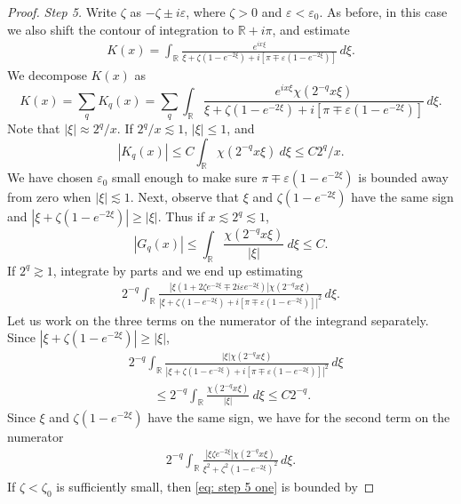 \documentclass[GreensFunctions.tex]{subfiles}
\begin{document}
\begin{proof}
	{\em Step 5.} 
	Write $\zeta$ as $-\zeta\pm i\varepsilon$, where $\zeta>0$ and 
	$\varepsilon<\varepsilon_0$. As before, in this case we also shift 
	the contour of integration to ${\mathbb R}+i\pi$, and estimate
	\begin{align*}
		K(x) 
			= 
				\int_{\mathbb R} 
					\frac{e^{ix\xi}}
						{\xi+\zeta(1-e^{-2\xi})+i[\pi\mp \varepsilon(1-e^{-2\xi})]}
				\,d\xi.	
	\end{align*}
	We decompose $K(x)$ as
	\begin{equation}
		K(x) 
			= 
				\sum_q K_q(x) 
			= 
				\sum_q
				\int_{\mathbb R} 
					\frac{e^{ix\xi}\chi(2^{-q}x\xi)}
						{\xi+\zeta(1-e^{-2\xi})+i[\pi\mp \varepsilon(1-e^{-2\xi})]}
				\,d\xi.
	\end{equation}
	Note that $|\xi|\approx 2^q/x$. If $2^q/x\lesssim 1$, $|\xi|\le 1$, and 
	\[
		|K_q(x)|\le C\int_{\mathbb R} \chi(2^{-q}x\xi)~d\xi\le C2^q/x.
	\]
	We have chosen $\varepsilon_0$ small enough to make sure 
	$\pi\mp \varepsilon(1-e^{-2\xi})$ is bounded away from zero when $|\xi|\lesssim 1$. 
	Next, observe that $\xi$ and $\zeta(1-e^{-2\xi})$ have the same sign and 
	$|\xi+\zeta(1-e^{-2\xi})|\ge |\xi|$. Thus if $x\lesssim 2^q \lesssim 1$, 
	\[
		|G_q(x)|\le \int_{\mathbb R} \frac{\chi(2^{-q}x\xi)}{|\xi|}~d\xi\le C.
	\]
	If $2^q\gtrsim 1$, integrate by parts and we end up estimating
	\begin{align}\label{eq: step 5 two}
		2^{-q}
		\int_{\mathbb R} 
			\frac{|\xi(1+2\zeta e^{-2\xi} \mp 2i\varepsilon e^{-2\xi})|\chi(2^{-q}x\xi)}
				{|\xi+\zeta(1-e^{-2\xi})+i[\pi\mp \varepsilon(1-e^{-2\xi})]|^2}
		\,d\xi.		
	\end{align}
	Let us work on the three terms on the numerator of the integrand separately. 
	Since $|\xi+\zeta(1-e^{-2\xi})|\ge |\xi|$, 
	\begin{align*}
		&2^{-q}
		\int_{\mathbb R} 
			\frac{|\xi|\chi(2^{-q}x\xi)}
				{|\xi+\zeta(1-e^{-2\xi})+i[\pi\mp \varepsilon(1-e^{-2\xi})]|^2}
			\,d\xi 
			\\
		&\qquad \le 2^{-q}
			\int_{\mathbb R} \frac{\chi(2^{-q}x\xi)}{|\xi|}~d\xi 
			\le C2^{-q}.
	\end{align*}
	Since $\xi$ and $\zeta(1-e^{-2\xi})$ have the same sign, we have for the second 
	term on the numerator
	\begin{align}\label{eq: step 5 one}
		2^{-q}
		\int_{\mathbb R} 
			\frac{|\xi \zeta e^{-2\xi} |\chi(2^{-q}x\xi)}{\xi^2+\zeta^2(1-e^{-2\xi})^2}
		\,d\xi.
	\end{align}
	If $\zeta<\zeta_0$ is sufficiently small, then \eqref{eq: step 5 one} is bounded by

\end{proof}
\end{document}
